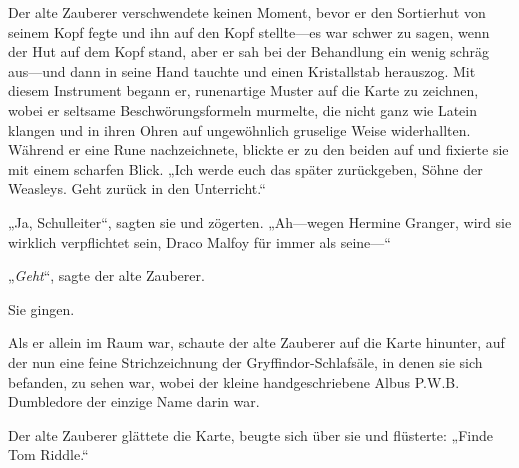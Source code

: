 Der alte Zauberer verschwendete keinen Moment, bevor er den Sortierhut von seinem Kopf fegte und ihn auf den Kopf stellte—es war schwer zu sagen, wenn der Hut auf dem Kopf stand, aber er sah bei der Behandlung ein wenig schräg aus—und dann in seine Hand tauchte und einen Kristallstab herauszog. Mit diesem Instrument begann er, runenartige Muster auf die Karte zu zeichnen, wobei er seltsame Beschwörungsformeln murmelte, die nicht ganz wie Latein klangen und in ihren Ohren auf ungewöhnlich gruselige Weise widerhallten. Während er eine Rune nachzeichnete, blickte er zu den beiden auf und fixierte sie mit einem scharfen Blick.
„Ich werde euch das später zurückgeben, Söhne der Weasleys. Geht zurück in den Unterricht.“

„Ja, Schulleiter“, sagten sie und zögerten.
„Ah—wegen Hermine Granger, wird sie wirklich verpflichtet sein, Draco Malfoy für immer als seine—“

„\emph{Geht}“, sagte der alte Zauberer.

Sie gingen.

Als er allein im Raum war, schaute der alte Zauberer auf die Karte hinunter, auf der nun eine feine Strichzeichnung der Gryffindor-Schlafsäle, in denen sie sich befanden, zu sehen war, wobei der kleine handgeschriebene Albus P.W.B. Dumbledore der einzige Name darin war.

Der alte Zauberer glättete die Karte, beugte sich über sie und flüsterte:
„Finde Tom Riddle.“

